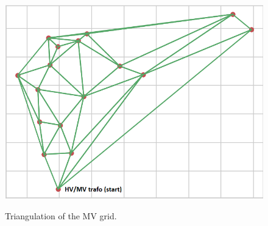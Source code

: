 \begin{figure}[h]
	\begin{centering}
		{\includegraphics[scale=0.5]{figures/experiments/1000_iter/tri_1000.png}}
		\caption{Triangulation of the MV grid.}
		\label{fig:tri_1000}
	\end{centering}
\end{figure}
